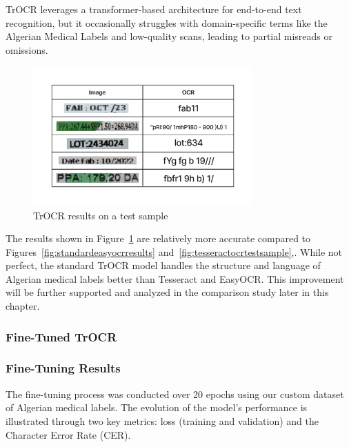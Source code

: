 TrOCR leverages a transformer-based architecture for end-to-end text recognition,  but it occasionally struggles with domain-specific terms like the Algerian Medical Labels and low-quality scans, leading to partial misreads or omissions.

\begin{figure}[H]
    \centering
    \includegraphics[width=0.75\textwidth]{Figures/Chapter 3/standard_trocr_results.png}
    \caption{TrOCR results on a test sample}
    \label{fig:TrOCRresultstestsample}
\end{figure}

The results shown in Figure~\ref{fig:TrOCRresultstestsample} are relatively more accurate compared to Figures~\ref{fig:standardeasyocrresults} and~\ref{fig:tesseractocrtestsample},. While not perfect, the standard TrOCR model handles the structure and language of Algerian medical labels better than Tesseract and EasyOCR. This improvement will be further supported and analyzed in the comparison study later in this chapter.


\subsubsection{Fine-Tuned TrOCR}

\subsubsection*{Fine-Tuning Results}

The fine-tuning process was conducted over 20 epochs using our custom dataset of Algerian medical labels. The evolution of the model's performance is illustrated through two key metrics: loss (training and validation) and the Character Error Rate (CER).

